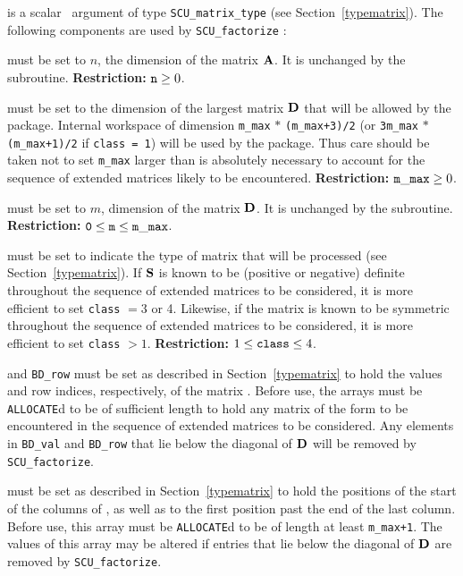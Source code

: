 \documentclass{galahad}
\newcommand{\packagename}{SCU}
\begin{document}
\vspace*{-3mm}
\begin{description}

 is a scalar \intentinout\ argument of type 
{\tt \packagename\_matrix\_type} 
(see Section~\ref{typematrix}). 
The following components are used by {\tt \packagename\_factorize} : 
 
\begin{description} 
 must be set to $n$, the dimension of the matrix $ {\mathbf{A}}$. 
It is unchanged by the subroutine. {\bf Restriction:} ${\tt n} \geq 0$.
 
 must be set to the 
dimension of the largest matrix ${\mathbf{D}}$ that will be allowed 
by the package. Internal workspace of dimension 
{\tt m\_max} $\ast$ {\tt (m\_max+3)/2} 
(or {\tt 3m\_max} $\ast$ {\tt (m\_max+1)/2} if {\tt class = 1}) 
will be used by the package. Thus care should be taken not to set {\tt m\_max} 
larger than is absolutely necessary to account for the sequence of  
extended matrices likely to be encountered. 
{\bf Restriction:} ${\tt m\_max} \geq 0$.
 
 must be set to $m$, dimension of the matrix ${\mathbf{D}}$. 
It is unchanged by the subroutine. 
{\bf Restriction:} ${\tt 0} \leq {\tt m} \leq {\tt m\_max}$.
 
 must be set to indicate the type of matrix that will be
processed (see Section~\ref{typematrix}). 
If ${\mathbf{S}}$ is known 
to be (positive or negative) definite throughout the sequence 
of extended matrices to be considered, it is more efficient to set 
{\tt class} $= 3$ or 4. Likewise, if the matrix is known 
to be symmetric throughout the sequence 
of extended matrices to be considered, it is more efficient to set 
{\tt class} $> 1$.  
{\bf Restriction:} $1 \leq  {\tt class} \leq 4$. 
 
 and {\tt BD\_row} must be set as described in 
Section~\ref{typematrix}  to hold the values and row indices, respectively, 
of the matrix .  Before use, the arrays must be {\tt ALLOCATE}d 
to be of sufficient length to hold any matrix of the form  
to be encountered in the sequence of 
extended matrices to be considered. Any elements in {\tt BD\_val} and 
{\tt BD\_row} 
that lie below the diagonal of ${\mathbf{D}}$ will be removed by 
{\tt \packagename\_factorize}. 
 
 must be set as described in Section~\ref{typematrix}
to hold the 
positions of the start of the columns of , as well as to the first 
position past the end of the last column. 
Before use, this array must be {\tt ALLOCATE}d to be of length at least 
{\tt m\_max+1}. 
The values of this array may be altered if entries that lie 
below the diagonal of ${\mathbf{D}}$ are removed by {\tt \packagename\_factorize}. 
 

\end{description}
\end{description}
\end{document}
